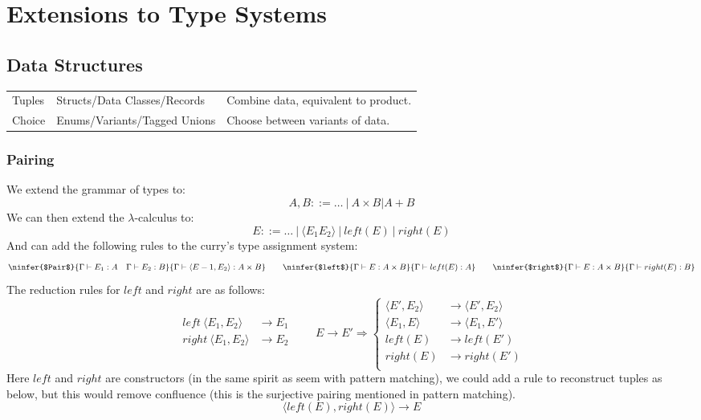 \chapter{Extensions to Type Systems}

\section{Data Structures}
\begin{tabular}{l l l}
    Tuples & Structs/Data Classes/Records & Combine data, equivalent to product. \\
    Choice & Enums/Variants/Tagged Unions & Choose between variants of data. \\
\end{tabular}
\subsection{Pairing}
We extend the grammar of types to:
\[A, B ::= \dots \ | \ A \times B | A + B\]
We can then extend the $\lambda$-calculus to:
\[E ::= \dots \ | \ \langle E_1 E_2 \rangle \ | \ left (E) \ | \ right(E) \]
And can add the following rules to the curry's type assignment system:
\[\ninfer{$Pair$}{\Gamma \vdash E_1 : A \quad \Gamma \vdash E_2 : B}{\Gamma \vdash \langle E-1, E_2 \rangle : A \times B}
\qquad \ninfer{$left$}{\Gamma \vdash E : A \times B}{\Gamma \vdash left (E) : A}
\qquad \ninfer{$right$}{\Gamma \vdash E : A \times B}{\Gamma \vdash right (E) : B}\]
The reduction rules for $left$ and $right$ are as follows:
\[\begin{split}
    left \ \langle E_1, E_2 \rangle & \to E_1 \\
    right \ \langle E_1, E_2 \rangle & \to E_2 \\
\end{split} \qquad
E \to E' \Rightarrow \begin{cases}
    \langle E', E_2 \rangle & \to \langle E', E_2 \rangle \\
    \langle E_1, E \rangle & \to \langle E_1, E' \rangle \\
    left (E) & \to left (E') \\
    right (E) & \to right (E') \\
\end{cases}\]
Here $left$ and $right$ are constructors (in the same spirit as seem with pattern matching), we could add a rule to reconstruct tuples as below, but this would remove confluence (this is the surjective pairing mentioned in pattern matching).
\[\langle left(E), right(E) \rangle \to E\]

